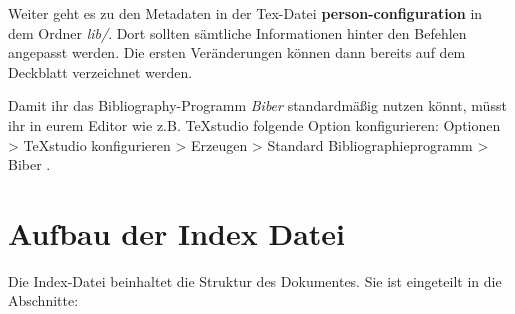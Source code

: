 Weiter geht es zu den Metadaten in der Tex-Datei \textbf{person-configuration} in dem Ordner \emph{lib/}. Dort sollten sämtliche Informationen hinter den Befehlen angepasst werden. Die ersten Veränderungen können dann bereits auf dem Deckblatt verzeichnet werden.

Damit ihr das Bibliography-Programm \emph{Biber} standardmäßig nutzen könnt, müsst ihr in eurem Editor wie z.B. TeXstudio folgende Option konfigurieren: Optionen > TeXstudio konfigurieren > Erzeugen > Standard Bibliographieprogramm > Biber .

\section{Aufbau der Index Datei}

Die Index-Datei beinhaltet die Struktur des Dokumentes. Sie ist eingeteilt in die Abschnitte:
